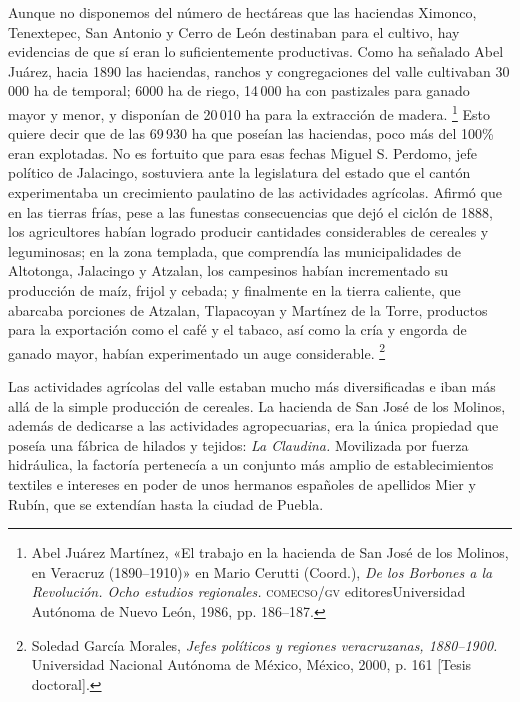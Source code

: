 \documentclass[14pt,twoside,final]{extbook} %
\let\oldfootnote\footnote
\renewcommand\footnote[1]{%
\oldfootnote{\hspace{1mm}#1}}
\begin{document}
Aunque no disponemos del número de hectáreas que las haciendas Ximonco, Tenextepec, San Antonio y Cerro de León destinaban para el cultivo, hay evidencias de que sí eran lo suficientemente productivas. Como ha señalado Abel Juárez, hacia 1890 las haciendas, ranchos y congregaciones del valle cultivaban 30\,000 ha de temporal; 6000 ha de riego, 14\,000 ha con pastizales para ganado mayor y menor, y disponían de 20\,010 ha para la extracción de madera.\footnote{Abel Juárez Martínez, «El trabajo en la hacienda de San José de los Molinos, en Veracruz (\mbox{1890--1910})» en Mario Cerutti (Coord.), \emph{De los Borbones a la Revolución. Ocho estudios regionales.} \textsc{comecso/gv} editores\kernedslash Universidad Autónoma de Nuevo León, 1986, pp. 186--187.} Esto quiere decir que de las 69\,930 ha que poseían las haciendas, poco más del 100\% eran explotadas. No es fortuito que para esas fechas Miguel S. Perdomo, jefe político de Jalacingo, sostuviera ante la legislatura del estado que el cantón experimentaba un crecimiento paulatino de las actividades agrícolas. Afirmó que en las tierras frías, pese a las funestas consecuencias que dejó el ciclón de 1888, los agricultores habían logrado producir cantidades considerables de cereales y leguminosas; en la zona templada, que comprendía las municipalidades de Altotonga, Jalacingo y Atzalan, los campesinos habían incrementado su producción de maíz, frijol y cebada; y finalmente en la tierra caliente, que abarcaba porciones de Atzalan, Tlapacoyan y Martínez de la Torre, productos para la exportación como el café y el tabaco, así como la cría y engorda de ganado mayor, habían experimentado un auge considerable.\footnote{Soledad García Morales, \emph{Jefes políticos y regiones veracruzanas, 1880--1900.} Universidad Nacional Autónoma de México, México, 2000, p. 161 [Tesis doctoral].}

Las actividades agrícolas del valle estaban mucho más diversificadas e iban más allá de la simple producción de cereales. La hacienda de San José de los Molinos, además de dedicarse a las actividades agropecuarias, era la única propiedad que poseía una fábrica de hilados y tejidos: \emph{La Claudina.} Movilizada por fuerza hidráulica, la factoría pertenecía a un conjunto más amplio de establecimientos textiles e intereses en poder de unos hermanos españoles de apellidos Mier y Rubín, que se extendían hasta la ciudad de Puebla.
\end{document}
